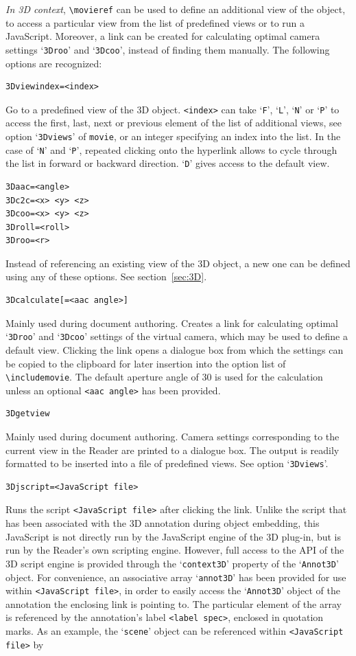 \documentclass[a4paper]{article}
\begin{document}
\emph{In 3D context}, \verb+\movieref+ can be used to define an additional view of the object, to access a particular view from the list of predefined views or to run a JavaScript. Moreover, a link can be created for calculating optimal camera settings `\verb+3Droo+' and `\verb+3Dcoo+', instead of finding them manually. The following options are recognized:
\begin{verbatim}
3Dviewindex=<index>
\end{verbatim}
Go to a predefined view of the 3D object. \verb+<index>+ can take `\verb+F+', `\verb+L+', `\verb+N+' or `\verb+P+' to access the first, last, next or previous element of the list of additional views, see option `\verb+3Dviews+' of {\tt \string\-movie}, or an integer specifying an index into the list. In the case of `\verb+N+' and `\verb+P+', repeated clicking onto the hyperlink allows to cycle through the list in forward or backward direction. `\verb+D+' gives access to the default view.
\begin{verbatim}
3Daac=<angle>
3Dc2c=<x> <y> <z>
3Dcoo=<x> <y> <z>
3Droll=<roll>
3Droo=<r>
\end{verbatim}
Instead of referencing an existing view of the 3D object, a new one can be defined using any of these options. See section~\ref{sec:3D}.
\begin{verbatim}
3Dcalculate[=<aac angle>]
\end{verbatim}
Mainly used during document authoring. Creates a link for calculating optimal `\verb+3Droo+' and `\verb+3Dcoo+' settings of the virtual camera, which may be used to define a default view. Clicking the link opens a dialogue box from which the settings can be copied to the clipboard for later insertion into the option list of \verb+\includemovie+. The default aperture angle of $30$\textdegree{} is used for the calculation unless an optional \verb+<aac angle>+ has been provided.
\begin{verbatim}
3Dgetview
\end{verbatim}
Mainly used during document authoring. Camera settings corresponding to the current view in the Reader are printed to a dialogue box. The output is readily formatted to be inserted into a file of predefined views. See option `\verb+3Dviews+'.
\begin{verbatim}
3Djscript=<JavaScript file>
\end{verbatim}
Runs the script \verb+<JavaScript file>+ after clicking the link. Unlike the script that has been associated with the 3D annotation during object embedding, this JavaScript is not directly run by the JavaScript engine of the 3D plug-in, but is run by the Reader's own scripting engine. However, full access to the API of the 3D script engine is provided through the `\verb+context3D+' property of the `\verb+Annot3D+' object. For convenience, an associative array `\verb+annot3D+' has been provided for use within \verb+<JavaScript file>+, in order to easily access the `\verb+Annot3D+' object of the annotation the enclosing link is pointing to. The particular element of the array is referenced by the annotation's label \verb+<label spec>+, enclosed in quotation marks. As an example, the `\verb+scene+' object can be referenced within \verb+<JavaScript file>+ by
\end{document}
